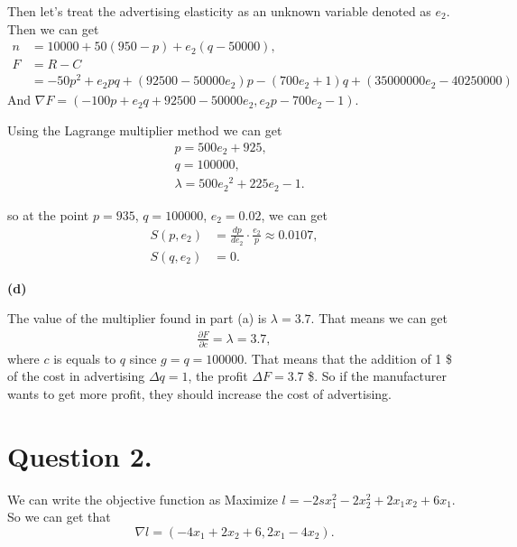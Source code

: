 \documentclass{report}
\begin{document}
\par Then let's treat the advertising elasticity as an unknown variable denoted as $e_2$. 
Then we can get 
\begin{align*}
    n&=10000+50(950-p)+e_2(q-50000),\\
    F&=R-C\\
    &=-50p^2 +e_2pq+(92500-50000e_2)p-(700e_2 +1)q+(35000000e_2 -40250000) 
\end{align*}
And $\nabla F =(-100p+e_2 q+92500-50000e_2, e_2 p-700e_2 -1)$.
\par Using the Lagrange multiplier method we can get 
\begin{align*}
    &p=500e_2 + 925,\\
    &q=100000,\\
    &\lambda =500{e_2}^2 +225e_2 -1.
\end{align*}
\par so at the point $p = 935$, $q=100000$, $e_2=0.02$, we can get 
\begin{align*}
    S(p,e_2)&=\frac{dp}{de_2}\cdot \frac{e_2}{p} \approx 0.0107,\\
    S(q,e_2)&=0.
\end{align*}

{\bf (d)}\par
The value of the multiplier found in part (a) is $\lambda = 3.7$.
That means we can get 
\begin{align*}
    \frac{\partial F}{\partial c} = \lambda =3.7,
\end{align*}
 where $c$ is equals to $q$ since $g = q = 100000$.
That means that the addition of 1 \$ of the cost in advertising $\Delta q = 1$, the profit 
$\Delta F = 3.7$ \$. So if the manufacturer wants to get more profit, 
they should increase the cost of advertising.

\newpage
\section*{Question 2.}
\par We can write the objective function as Maximize $l = -2sx_1 ^{2}-2x_2 ^{2}+2x_1 x_2+6x_1$. So we can get that 
\begin{equation*}
    \nabla l =(-4x_1 +2x_2 +6,2x_1 - 4x_2).
\end{equation*}
\end{document}
